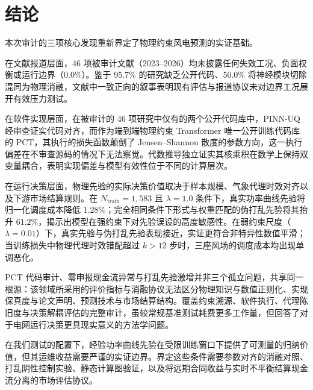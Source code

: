 \section{结论}
\label{sec:conclusion}

本次审计的三项核心发现重新界定了物理约束风电预测的实证基础。

在文献报道层面，46 项被审计文献（2023--2026）均未披露任何失效工况、负面权衡或运行边界（0.0\%）。鉴于 95.7\% 的研究缺乏公开代码、50.0\% 将神经模块切除混同为物理消融，文献中一致正向的叙事表明现有评估与报道协议未对边界工况展开有效压力测试。

在软件实现层面，在被审计的 46 项研究中仅有的两个公开代码库中，PINN-UQ 经审查证实代码对齐，而作为端到端物理约束 Transformer 唯一公开训练代码库的 PCT，其执行的损失函数颠倒了 Jensen--Shannon 散度的参数方向，这一执行偏差在不审查源码的情况下无法察觉。代数推导独立证实其核乘积在数学上保持双变量耦合，表明实现偏差与模型有效性位于不同的计算层次。

在运行决策层面，物理先验的实际决策价值取决于样本规模、气象代理时效对齐以及下游市场结算规则。在 $N_{\text{train}}=1{,}583$ 且 $\lambda=1.0$ 条件下，真实功率曲线先验将归一化调度成本降低 $1.28\%$；完全相同条件下形式与权重匹配的伪打乱先验将其抬升 $61.2\%$，揭示出模型在强约束下对先验误设的高度敏感性。在弱约束尺度（$\lambda=0.01$）下，真实先验与伪打乱先验表现接近，实证更符合非特异性数值平滑；当训练损失中物理代理时效错配超过 $k > 12$ 步时，三座风场的调度成本均出现单调恶化。

PCT 代码审计、零申报现金流异常与打乱先验激增并非三个孤立问题，共享同一根源：该领域所采用的评价指标与消融协议无法区分物理知识与数值正则化、实现保真度与论文声明、预测技术与市场结算结构。覆盖约束溯源、软件执行、代理陈旧度与决策解耦评估的完整审计，虽较常规基准测试耗费更多工作量，但回答了对于电网运行决策更具现实意义的方法学问题。

在我们测试的配置下，经验功率曲线先验在受限训练窗口下提供了可测量的归纳价值，但其运维收益需要严谨的实证边界。界定这些条件需要参数对齐的消融对照、打乱阴性控制实验、静态计算图验证，以及将远期合同收益与实时不平衡结算现金流分离的市场评估协议。
